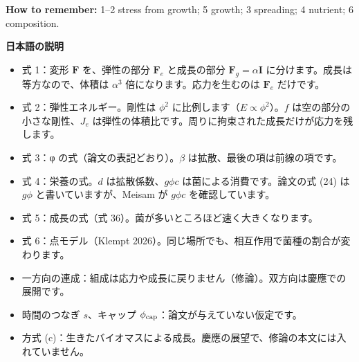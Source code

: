\documentclass[10pt,a4paper]{ltjsarticle}
\begin{document}
\textbf{How to remember:} 1--2 stress from growth; 5 growth; 3 spreading; 4 nutrient; 6 composition.

\vspace{6pt}
{\bfseries 日本語の説明}\par
\begin{itemize}
\item 式 1：変形 $\mathbf F$ を、弾性の部分 $\mathbf F_e$ と成長の部分 $\mathbf F_g=\alpha\mathbf I$ に分けます。成長は等方なので、体積は $\alpha^3$ 倍になります。応力を生むのは $\mathbf F_e$ だけです。
\item 式 2：弾性エネルギー。剛性は $\phi^2$ に比例します（$E\propto\phi^2$）。$f$ は空の部分の小さな剛性、$J_e$ は弾性の体積比です。周りに拘束された成長だけが応力を残します。
\item 式 3：φ の式（論文の表記どおり）。$\beta$ は拡散、最後の項は前線の項です。
\item 式 4：栄養の式。$d$ は拡散係数、$g\phi c$ は菌による消費です。論文の式 (24) は $g\phi$ と書いていますが、Meisam が $g\phi c$ を確認しています。
\item 式 5：成長の式（式 36）。菌が多いところほど速く大きくなります。
\item 式 6：点モデル（Klempt 2026）。同じ場所でも、相互作用で菌種の割合が変わります。
\item 一方向の連成：組成は応力や成長に戻りません（修論）。双方向は慶應での展開です。
\item 時間のつなぎ $s$、キャップ $\phi_{\rm cap}$：論文が与えていない仮定です。
\item 方式 (c)：生きたバイオマスによる成長。慶應の展望で、修論の本文には入れていません。
\end{itemize}
\end{document}
